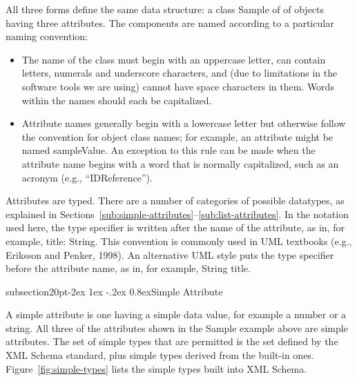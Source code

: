 \documentclass[10pt]{article}
\makeatletter
\renewcommand{\subsection}{\@startsection%
  {subsection}{2}{0pt}{-2ex \@plus 1ex \@minus -.2ex}%
  {0.8ex}{\slshape\large\bfseries}}
\newcommand{\class}[1]{\textsf{#1}}
\newcommand{\attrib}[1]{\textsf{#1}}
\makeatother
\begin{document}
All three forms define the same data structure: a class \class{Sample} of
of objects having three attributes.  The components are named according to
a particular naming convention:
\begin{itemize}
  
\item The name of the class must begin with an uppercase letter, can
  contain letters, numerals and underscore characters, and (due to
  limitations in the software tools we are using) cannot have space
  characters in them.  Words within the names should each be capitalized.
  
\item Attribute names generally begin with a lowercase letter but otherwise
  follow the convention for object class names; for example, an attribute
  might be named \attrib{sampleValue}.  An exception to this rule can be
  made when the attribute name begins with a word that is normally
  capitalized, such as an acronym (e.g., ``\attrib{IDReference}'').

\end{itemize}

Attributes are typed.  There are a number of categories of possible
datatypes, as explained in
Sections~\ref{sub:simple-attributes}--\ref{sub:list-attributes}.  In the
notation used here, the type specifier is written after the name of the
attribute, as in, for example, \attrib{title: String}.  This convention is
commonly used in UML textbooks (e.g., Eriksson and Penker, 1998).  An
alternative UML style puts the type specifier before the attribute name, as
in, for example, \attrib{String title}.


\subsection{Simple Attribute}
\label{sub:simple-attributes}

A simple attribute is one having a simple data value, for example a number
or a string.  All three of the attributes shown in the \class{Sample}
example above are simple attributes.  The set of simple types that are
permitted is the set defined by the XML Schema standard, plus simple types
derived from the built-in ones.  Figure~\ref{fig:simple-types} lists the
simple types built into XML Schema.
\end{document}
